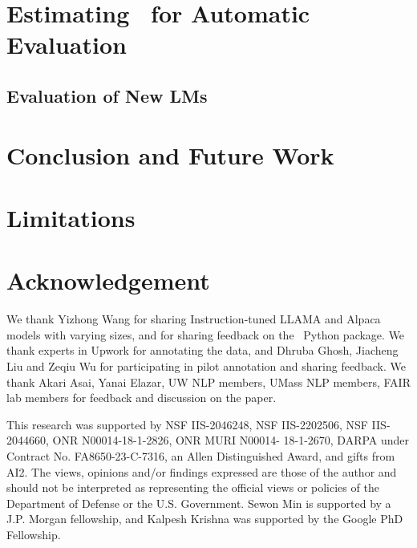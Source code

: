 \documentclass[11pt]{article}
\begin{document}
\section{Estimating \ours\ for Automatic Evaluation}\label{sec:method}

\subsection{Evaluation of New LMs}\label{sec:eval-new-lms}


\section{Conclusion and Future Work}\label{sec:concl}
\section*{Limitations}\label{sec:limitation}

\section*{Acknowledgement}
We thank Yizhong Wang for sharing Instruction-tuned LLAMA and Alpaca models with varying sizes, and for sharing feedback on the \ours\ Python package. We thank experts in Upwork for annotating the data, and Dhruba Ghosh, Jiacheng Liu and Zeqiu Wu for participating in pilot annotation and sharing feedback. We thank Akari Asai, Yanai Elazar, UW NLP members, UMass NLP members, FAIR lab members for feedback and discussion on the paper.

This research was supported by
NSF IIS-2046248, NSF IIS-2202506, NSF IIS-2044660, ONR N00014-18-1-2826, ONR MURI N00014- 18-1-2670, DARPA under Contract No. FA8650-23-C-7316, an Allen Distinguished Award, and gifts from AI2.
The views, opinions and/or findings expressed are those of the author and should not be interpreted as representing the official views or policies of the Department of Defense or the U.S. Government.
Sewon Min is supported by a J.P. Morgan fellowship, and Kalpesh Krishna was supported by the Google PhD Fellowship.
\end{document}
